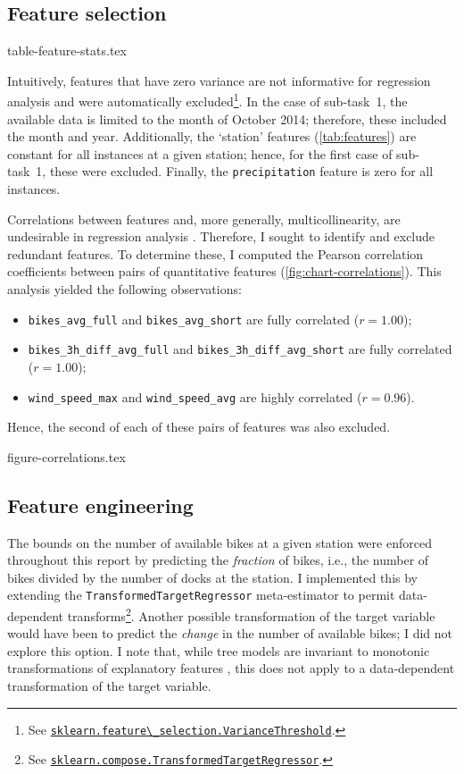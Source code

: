 \documentclass[11pt]{extarticle}
\newcommand{\windspeedmax}{wind\_speed\_max}
\newcommand{\windspeedavg}{wind\_speed\_avg}
\newcommand{\bikesavgfull}{bikes\_avg\_full}
\newcommand{\bikesavgshort}{bikes\_avg\_short}
\newcommand{\bikeshdiffavgfull}{bikes\_3h\_diff\_avg\_full}
\newcommand{\bikeshdiffavgshort}{bikes\_3h\_diff\_avg\_short}
\newcommand{\sklearn}[2]{\href{https://scikit-learn.org/stable/modules/generated/sklearn.#1.#2.html}{\lstinline|sklearn.#1.#2|}}
\begin{document}
\subsection{Feature selection}
\label{sec:feature-selection}

{table-feature-stats.tex}

Intuitively, features that have zero variance are not informative for regression
analysis and were automatically excluded\footnote{See
  \sklearn{feature\_selection}{VarianceThreshold}.
}.
In the case of sub-task~1, the available data is limited to the month of October 2014;
therefore, these included the month and year.
Additionally, the `station' features (\cref{tab:features}) are constant for all
instances at a given station; hence, for the first case of sub-task~1, these were
excluded.
Finally, the \texttt{precipitation} feature is zero for all instances.

Correlations between features and, more generally, multicollinearity, are undesirable
in regression analysis \parencite{Alin2010}.
Therefore, I sought to identify and exclude redundant features.
To determine these, I computed the Pearson correlation coefficients between pairs of
quantitative features (\cref{fig:chart-correlations}).
This analysis yielded the following observations:
\begin{itemize}
  \item \texttt{\bikesavgfull} and \texttt{\bikesavgshort} are fully correlated ($r = 1.00$);
  \item \texttt{\bikeshdiffavgfull} and \texttt{\bikeshdiffavgshort} are fully correlated ($r  = 1.00$);
  \item \texttt{\windspeedmax} and \texttt{\windspeedavg} are highly correlated ($r = 0.96$).
\end{itemize}
Hence, the second of each of these pairs of features was also excluded.

{figure-correlations.tex}

\subsection{Feature engineering}
\label{sec:feature-engineering}

The bounds on the number of available bikes at a given station were enforced throughout
this report by predicting the \emph{fraction} of bikes, i.e., the number of bikes
divided by the number of docks at the station.
I implemented this by extending the \texttt{TransformedTargetRegressor} meta-estimator
to permit data-dependent transforms\footnote{See
  \sklearn{compose}{TransformedTargetRegressor}.
}.
Another possible transformation of the target variable would have been to predict the
\emph{change} in the number of available bikes; I did not explore this option.
I note that, while tree models are invariant to monotonic transformations of
explanatory features \parencite[e.g.,][3184]{Death2000}, this does not apply to a
data-dependent transformation of the target variable.
\end{document}
